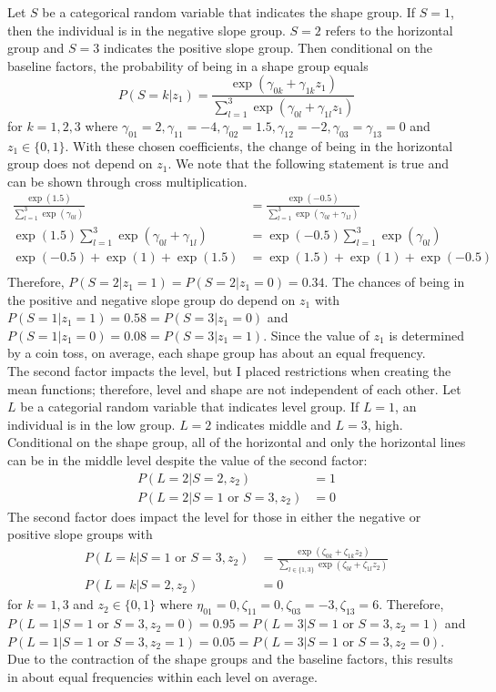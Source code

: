 Let $S$ be a categorical random variable that indicates the shape group. If $S=1$, then the individual is in the negative slope group. $S=2$ refers to the horizontal group and $S=3$ indicates the positive slope group. Then conditional on the baseline factors, the probability of being in a shape group equals
$$P(S=k |z_{1}) = \frac{\exp(\gamma_{0k}+\gamma_{1k}z_{1})}{\sum^{3}_{l=1} \exp(\gamma_{0l}+\gamma_{1l}z_{1})}$$
for $k=1,2,3$ where $\gamma_{01}=2,\gamma_{11} = -4,\gamma_{02}=1.5,\gamma_{12}=-2,\gamma_{03}=\gamma_{13} = 0$ and $z_{1}\in\{0,1\}$. With these chosen coefficients, the change of being in the horizontal group does not depend on $z_{1}$. We note that the following statement is true and can be shown through cross multiplication.
\begin{align*}\frac{\exp(1.5)}{\sum^{3}_{l=1} \exp(\gamma_{0l})} & =\frac{\exp(-0.5)}{\sum^{3}_{l=1} \exp(\gamma_{0l}+\gamma_{1l})}\\
\exp(1.5)\sum^{3}_{l=1} \exp(\gamma_{0l}+\gamma_{1l}) & =\exp(-0.5)\sum^{3}_{l=1} \exp(\gamma_{0l})\\
\exp(-0.5)+\exp(1)+\exp(1.5)& =\exp(1.5)+\exp(1)+\exp(-0.5)\\
\end{align*}
Therefore, $P(S=2|z_{1}=1) = P(S=2|z_{1}=0) = 0.34$. The chances of being in the positive and negative slope group do depend on $z_{1}$ with $P(S=1|z_{1}=1) = 0.58 = P(S=3|z_{1}=0)$ and $P(S=1|z_{1}=0) = 0.08 = P(S=3|z_{1}=1)$. Since the value of $z_{1}$ is determined by a coin toss, on average, each shape group has about an equal  frequency. \\

The second factor impacts the level, but I placed restrictions when creating the mean functions; therefore, level and shape are not independent of each other. Let $L$ be a categorial random variable that indicates level group. If $L=1$, an individual is in the low group. $L=2$ indicates middle and $L=3$, high. Conditional on the shape group, all of the horizontal and only the horizontal lines can be in the middle level despite the value of the second factor:
\begin{align*}
P(L=2|S=2, z_{2}) & = 1\\
P(L=2|S=1 \text{ or } S=3, z_{2}) & = 0
\end{align*}
The second factor does impact the level for those in either the negative or positive slope groups with
\begin{align*}
P(L=k|S=1 \text{ or } S=3,z_{2}) & = \frac{\exp(\zeta_{0k}+\zeta_{1k} z_{2})}{\sum_{l\in\{1,3\} }\exp(\zeta_{0l}+\zeta_{1l}z_{2})}\\
P(L=k|S=2,z_{2}) & =0
\end{align*}
for $k=1,3$ and $z_{2}\in\{0,1\}$ where $\eta_{01}=0,\zeta_{11}=0,\zeta_{03}=-3,\zeta_{13}=6$. Therefore, $P(L=1|S=1 \text{ or }S=3,z_{2}=0) = 0.95 = P(L=3|S=1 \text{ or }S=3,z_{2}=1)$ and $P(L=1|S=1 \text{ or }S=3,z_{2}=1) = 0.05 = P(L=3|S=1 \text{ or }S=3,z_{2}=0)$.  Due to the contraction of the shape groups and the baseline factors, this results in about equal frequencies within each level on average.\\

